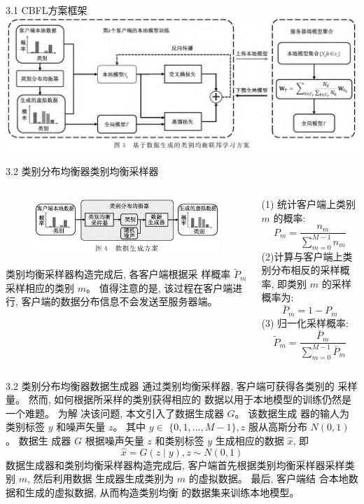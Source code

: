 \documentclass{sintefbeamer}
\theoremstyle{definition}
\begin{document}
\begin{frame}{3.1 CBFL方案框架}
\centering
\includegraphics[width=1\textwidth]{images/img_overview}

\end{frame}

	


\begin{frame}{3.2 类别分布均衡器}{类别均衡采样器}


\begin{columns}
\begin{column}{0.5\textwidth}
\begin{figure}[ht]
\centering
\includegraphics[width=1\textwidth]{images/img_gan}
\end{figure}

类别均衡采样器构造完成后, 各客户端根据采 样概率 $\widetilde{P}_m$ 采样相应的类别 $m$。 值得注意的是, 该过程在客户端进行, 客户端的数据分布信息不会发送至服务器端。
\end{column}
\begin{column}{0.5\textwidth}
(1) 统计客户端上类别 $m$ 的概率:
$$
P_m=\frac{n_m}{\sum_{m=0}^{M-1} n_m}
$$
(2)计算与客户端上类别分布相反的采样概率, 即类别 $m$ 的采样概率为:
$$
\bar{P}_m=1-P_m
$$
(3) 归一化采样概率:
$$
\widetilde{P}_m=\frac{\bar{P}_m}{\sum_{m=0}^{M-1} \bar{P}_m}
$$
\end{column}
\end{columns}


\end{frame}


\begin{frame}{3.2 类别分布均衡器}{数据生成器}
通过类别均衡采样器, 客户端可获得各类别的 采样量。 然而, 如何根据所采样的类别获得相应的 数据以用于本地模型的训练仍然是一个难题。 为解 决该问题, 本文引入了数据生成器 $G$。 该数据生成 器的输人为类别标签 $y$ 和噪声矢量 $z$。 其中 $y \in$ $\{0,1, \ldots, M-1\}, z$ 服从高斯分布 $N(0,1)$。 数据生 成器 $G$ 根据噪声矢量 $z$ 和类别标签 $y$ 生成相应的数据 $\hat{x}$, 即
$$
\hat{x}=G(z \mid y), z \sim N(0,1) 
$$
数据生成器和类别均衡采样器构造完成后, 客户端首先根据类别均衡采样器采样类别 $m$, 然后利用数据 生成器生成类别为 $m$ 的虚拟数据。 最后, 客户端结 合本地数据和生成的虚拟数据, 从而构造类别均衡 的数据集来训练本地模型。
\end{frame}
\end{document}
